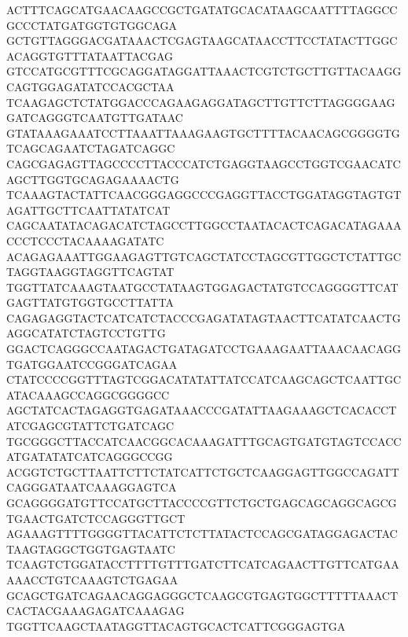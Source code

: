 ACTTTCAGCATGAACAAGCCGCTGATATGCACATAAGCAATTTTAGGCCGCCCTATGATGGTGTGGCAGA
GCTGTTAGGGACGATAAACTCGAGTAAGCATAACCTTCCTATACTTGGCACAGGTGTTTATAATTACGAG
GTCCATGCGTTTCGCAGGATAGGATTAAACTCGTCTGCTTGTTACAAGGCAGTGGAGATATCCACGCTAA
TCAAGAGCTCTATGGACCCAGAAGAGGATAGCTTGTTCTTAGGGGAAGGATCAGGGTCAATGTTGATAAC
GTATAAAGAAATCCTTAAATTAAAGAAGTGCTTTTACAACAGCGGGGTGTCAGCAGAATCTAGATCAGGC
CAGCGAGAGTTAGCCCCTTACCCATCTGAGGTAAGCCTGGTCGAACATCAGCTTGGTGCAGAGAAAACTG
TCAAAGTACTATTCAACGGGAGGCCCGAGGTTACCTGGATAGGTAGTGTAGATTGCTTCAATTATATCAT
CAGCAATATACAGACATCTAGCCTTGGCCTAATACACTCAGACATAGAAACCCTCCCTACAAAAGATATC
ACAGAGAAATTGGAAGAGTTGTCAGCTATCCTAGCGTTGGCTCTATTGCTAGGTAAGGTAGGTTCAGTAT
TGGTTATCAAAGTAATGCCTATAAGTGGAGACTATGTCCAGGGGTTCATGAGTTATGTGGTGCCTTATTA
CAGAGAGGTACTCATCATCTACCCGAGATATAGTAACTTCATATCAACTGAGGCATATCTAGTCCTGTTG
GGACTCAGGGCCAATAGACTGATAGATCCTGAAAGAATTAAACAACAGGTGATGGAATCCGGGATCAGAA
CTATCCCCGGTTTAGTCGGACATATATTATCCATCAAGCAGCTCAATTGCATACAAAGCCAGGCGGGGCC
AGCTATCACTAGAGGTGAGATAAACCCGATATTAAGAAAGCTCACACCTATCGAGCGTATTCTGATCAGC
TGCGGGCTTACCATCAACGGCACAAAGATTTGCAGTGATGTAGTCCACCATGATATATCATCAGGGCCGG
ACGGTCTGCTTAATTCTTCTATCATTCTGCTCAAGGAGTTGGCCAGATTCAGGGATAATCAAAGGAGTCA
GCAGGGGATGTTCCATGCTTACCCCGTTCTGCTGAGCAGCAGGCAGCGTGAACTGATCTCCAGGGTTGCT
AGAAAGTTTTGGGGTTACATTCTCTTATACTCCAGCGATAGGAGACTACTAAGTAGGCTGGTGAGTAATC
TCAAGTCTGGATACCTTTTGTTTGATCTTCATCAGAACTTGTTCATGAAAAACCTGTCAAAGTCTGAGAA
GCAGCTGATCAGAACAGGAGGGCTCAAGCGTGAGTGGCTTTTTAAACTCACTACGAAAGAGATCAAAGAG
TGGTTCAAGCTAATAGGTTACAGTGCACTCATTCGGGAGTGA


